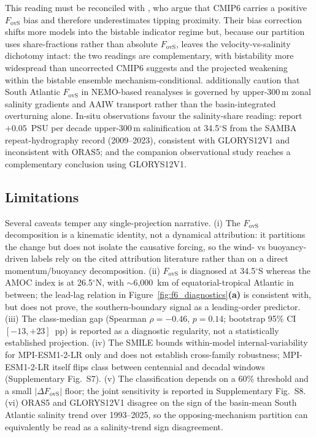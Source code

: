 \documentclass[11pt,a4paper]{article}
\begin{document}
This reading must be reconciled with \citet{vanWestenDijkstra2024}, who argue that CMIP6 carries a positive $F_{\mathrm{ovS}}$ bias and therefore underestimates tipping proximity. Their bias correction shifts more models into the bistable indicator regime but, because our partition uses share-fractions rather than absolute $F_{\mathrm{ovS}}$, leaves the velocity-vs-salinity dichotomy intact: the two readings are complementary, with bistability more widespread than uncorrected CMIP6 suggests and the projected weakening within the bistable ensemble mechanism-conditional. \citet{Mignac2019} additionally caution that South Atlantic $F_{\mathrm{ovS}}$ in NEMO-based reanalyses is governed by upper-300\,m zonal salinity gradients and AAIW transport rather than the basin-integrated overturning alone. In-situ observations favour the salinity-share reading: \citet{Volkov2024} report $+0.05$~PSU per decade upper-300\,m salinification at 34.5$^\circ$S from the SAMBA repeat-hydrography record (2009--2023), consistent with GLORYS12V1 and inconsistent with ORAS5; and the companion observational study \citep{FallahInReview} reaches a complementary conclusion using GLORYS12V1.

\subsection*{Limitations}

Several caveats temper any single-projection narrative. (i) The $F_{\mathrm{ovS}}$ decomposition is a kinematic identity, not a dynamical attribution: it partitions the change but does not isolate the causative forcing, so the wind- vs buoyancy-driven labels rely on the cited attribution literature \citep{Asbjornsen2023, Levang2020, Baker2023, Baker2025} rather than on a direct momentum/buoyancy decomposition. (ii) $F_{\mathrm{ovS}}$ is diagnosed at 34.5$^\circ$S whereas the AMOC index is at 26.5$^\circ$N, with $\sim$6{,}000~km of equatorial-tropical Atlantic in between; the lead-lag relation in Figure~\ref{fig:f6_diagnostics}\textbf{(a)} is consistent with, but does not prove, the southern-boundary signal as a leading-order predictor. (iii) The class-median gap (Spearman $\rho = -0.46$, $p = 0.14$; bootstrap 95\% CI $[-13, +23]$~pp) is reported as a diagnostic regularity, not a statistically established projection. (iv) The SMILE bounds within-model internal-variability for MPI-ESM1-2-LR only and does not establish cross-family robustness; MPI-ESM1-2-LR itself flips class between centennial and decadal windows (Supplementary Fig.~S7). (v) The classification depends on a 60\% threshold and a small $|\Delta F_{\mathrm{ovS}}|$ floor; the joint sensitivity is reported in Supplementary Fig.~S8. (vi) ORAS5 and GLORYS12V1 disagree on the sign of the basin-mean South Atlantic salinity trend over 1993--2025, so the opposing-mechanism partition can equivalently be read as a salinity-trend sign disagreement.
\end{document}
